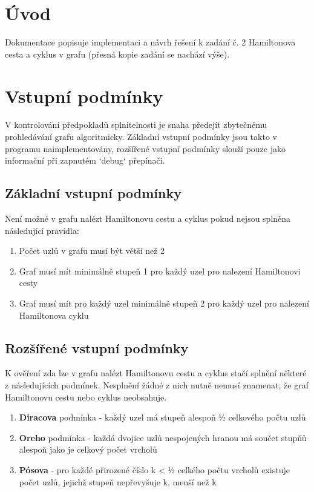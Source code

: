 \documentclass[a4paper,11pt]{article}
\begin{document}
\section{Úvod}

Dokumentace popisuje implementaci a návrh řešení k zadání č. 2 Hamiltonova cesta a cyklus v grafu (přesná kopie zadání se nachází výše).

\section{Vstupní podmínky}

V kontrolování předpokladů splnitelnosti je snaha předejít zbytečnému prohledávání grafu algoritmicky. Základní vstupní podmínky jsou takto v programu naimplementovány, rozšířené vstupní podmínky slouží pouze jako informační při zapnutém `debug` přepínači. 

\subsection{Základní vstupní podmínky}

Není možné v grafu nalézt Hamiltonovu cestu a cyklus pokud nejsou splněna následující pravidla:
\begin{enumerate}
	\item Počet uzlů v grafu musí být větší než 2
	\item Graf musí mít minimálně stupeň 1 pro každý uzel pro nalezení Hamiltonovi cesty
    \item Graf musí mít pro každý uzel minimálně stupeň 2 pro každý uzel pro nalezení Hamiltonova cyklu
\end{enumerate}
\newpage
\subsection{Rozšířené vstupní podmínky}

K ověření zda lze v grafu nalézt Hamiltonovu cestu a cyklus stačí splnění některé z následujících podmínek. Nesplnění žádné z nich nutně nemusí znamenat, že graf Hamiltonovu cestu nebo cyklus neobsahuje.
\begin{enumerate}
    \item \textbf{Diracova} podmínka - každý uzel má stupeň alespoň ½ celkového počtu uzlů
    \item \textbf{Oreho} podmínka - každá dvojice uzlů nespojených hranou má součet stupňů alespoň jako je celkový počet vrcholů
    \item \textbf{Pósova} - pro každé přirozené číslo k < ½ celkého počtu vrcholů existuje počet uzlů, jejichž stupeň nepřevyšuje k, menší než k
\end{enumerate}
\end{document}
